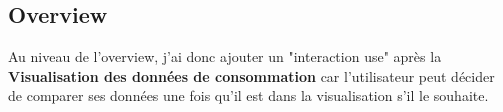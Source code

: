 \subsection{Overview}

\begin{flushleft}
Au niveau de l'overview, j'ai donc ajouter un "interaction use" après la \textbf{Visualisation des données de consommation} car l'utilisateur peut décider de comparer ses données une fois qu'il est dans la visualisation s'il le souhaite.
\end{flushleft}


